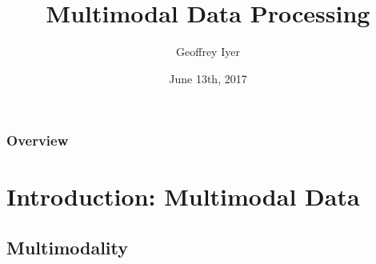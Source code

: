 \documentclass{beamer}
\title[Multimodal Data Processing]{Multimodal Data Processing} %
\author{Geoffrey Iyer} %
\institute[UCLA] %
{
  University of California \\ %
  \medskip
  \textit{gsiyer@math.ucla.edu} %
}
\date{June 13th, 2017} %
\begin{document}
\begin{frame}
  \titlepage %
\end{frame}

\begin{frame}
  \frametitle{Overview} %
  \tableofcontents %
\end{frame}


\section{Introduction: Multimodal Data} %

\subsection{Multimodality} %
\end{document}
